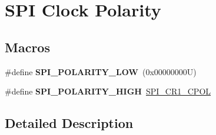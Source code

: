 \hypertarget{group___s_p_i___clock___polarity}{}\section{S\+PI Clock Polarity}
\label{group___s_p_i___clock___polarity}
\subsection*{Macros}
\begin{DoxyCompactItemize}
\item 
\mbox{\label{group___s_p_i___clock___polarity_gaf61e3c6ec671baef099516265793c8df}} 
\#define {\bfseries S\+P\+I\+\_\+\+P\+O\+L\+A\+R\+I\+T\+Y\+\_\+\+L\+OW}~(0x00000000\+U)
\item 
\mbox{\label{group___s_p_i___clock___polarity_ga6910e2527b7511eb3a55946b9b775cff}} 
\#define {\bfseries S\+P\+I\+\_\+\+P\+O\+L\+A\+R\+I\+T\+Y\+\_\+\+H\+I\+GH}~\mbox{\hyperlink{group___peripheral___registers___bits___definition_ga2616a10f5118cdc68fbdf0582481e124}{S\+P\+I\+\_\+\+C\+R1\+\_\+\+C\+P\+OL}}
\end{DoxyCompactItemize}


\subsection{Detailed Description}
